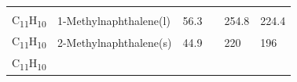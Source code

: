 \documentclass[
]{book}
\theoremstyle{definition}
\theoremstyle{definition}
\theoremstyle{definition}
\theoremstyle{remark}
\begin{document}
\begin{longtable}[]{@{}llllll@{}}
\begin{minipage}[t]{0.15\columnwidth}
\strut
\end{minipage} & \begin{minipage}[t]{0.14\columnwidth}\raggedright
\strut
\end{minipage} & \begin{minipage}[t]{0.14\columnwidth}\raggedright
\strut
\end{minipage}\tabularnewline
\begin{minipage}[t]{0.07\columnwidth}\raggedright
C\textsubscript{11}H\textsubscript{10}\strut
\end{minipage} & \begin{minipage}[t]{0.17\columnwidth}\raggedright
1-Methylnaphthalene(l)\strut
\end{minipage} & \begin{minipage}[t]{0.15\columnwidth}\raggedright
56.3\strut
\end{minipage} & \begin{minipage}[t]{0.15\columnwidth}\raggedright
\strut
\end{minipage} & \begin{minipage}[t]{0.14\columnwidth}\raggedright
254.8\strut
\end{minipage} & \begin{minipage}[t]{0.14\columnwidth}\raggedright
224.4\strut
\end{minipage}\tabularnewline
\begin{minipage}[t]{0.07\columnwidth}\raggedright
C\textsubscript{11}H\textsubscript{10}\strut
\end{minipage} & \begin{minipage}[t]{0.17\columnwidth}\raggedright
2-Methylnaphthalene(s)\strut
\end{minipage} & \begin{minipage}[t]{0.15\columnwidth}\raggedright
44.9\strut
\end{minipage} & \begin{minipage}[t]{0.15\columnwidth}\raggedright
\strut
\end{minipage} & \begin{minipage}[t]{0.14\columnwidth}\raggedright
220\strut
\end{minipage} & \begin{minipage}[t]{0.14\columnwidth}\raggedright
196\strut
\end{minipage}\tabularnewline
\begin{minipage}[t]{0.07\columnwidth}\raggedright
C\textsubscript{11}H\textsubscript{10}\strut
\end{minipage} & \begin{minipage}[t]{0.17\columnwidth}\raggedright

\end{minipage}
\end{longtable}
\end{document}
